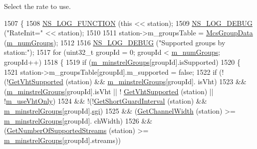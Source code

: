 Select the rate to use. 
\begin{DoxyCode}
1507 \{
1508   \hyperlink{log-macros-disabled_8h_a90b90d5bad1f39cb1b64923ea94c0761}{NS\_LOG\_FUNCTION} (\textcolor{keyword}{this} << station);
1509   \hyperlink{group__logging_ga413f1886406d49f59a6a0a89b77b4d0a}{NS\_LOG\_DEBUG} (\textcolor{stringliteral}{"RateInit="} << station);
1510 
1511   station->m\_groupsTable = \hyperlink{namespacens3_aceb821fdfc79d5a5aa23d14f85063f07}{McsGroupData} (\hyperlink{classns3_1_1MinstrelHtWifiManager_a8a0964148ee665bab466b2858e8094b7}{m\_numGroups});
1512 
1516   \hyperlink{group__logging_ga413f1886406d49f59a6a0a89b77b4d0a}{NS\_LOG\_DEBUG} (\textcolor{stringliteral}{"Supported groups by station:"});
1517   \textcolor{keywordflow}{for} (uint32\_t groupId = 0; groupId < \hyperlink{classns3_1_1MinstrelHtWifiManager_a8a0964148ee665bab466b2858e8094b7}{m\_numGroups}; groupId++)
1518     \{
1519       \textcolor{keywordflow}{if} (\hyperlink{classns3_1_1MinstrelHtWifiManager_a231741ce3f38417925019aa598570468}{m\_minstrelGroups}[groupId].isSupported)
1520         \{
1521           station->m\_groupsTable[groupId].m\_supported = \textcolor{keyword}{false};
1522           \textcolor{keywordflow}{if} (!(!\hyperlink{classns3_1_1WifiRemoteStationManager_aecf5ed3203b9b55cd831696a08daa5fe}{GetVhtSupported} (station) && \hyperlink{classns3_1_1MinstrelHtWifiManager_a231741ce3f38417925019aa598570468}{m\_minstrelGroups}[groupId].
      isVht)                    
1523               && (\hyperlink{classns3_1_1MinstrelHtWifiManager_a231741ce3f38417925019aa598570468}{m\_minstrelGroups}[groupId].isVht || !
      \hyperlink{classns3_1_1WifiRemoteStationManager_aecf5ed3203b9b55cd831696a08daa5fe}{GetVhtSupported} (station) || !\hyperlink{classns3_1_1MinstrelHtWifiManager_a6997df6e5760dd9891f2caea0a6e1937}{m\_useVhtOnly}) 
1524               && !(!\hyperlink{classns3_1_1WifiRemoteStationManager_aa55f6cb04128c88710119c8289f1b17e}{GetShortGuardInterval} (station) && 
      \hyperlink{classns3_1_1MinstrelHtWifiManager_a231741ce3f38417925019aa598570468}{m\_minstrelGroups}[groupId].\hyperlink{namespacestd}{sgi})             
1525               && (\hyperlink{classns3_1_1WifiRemoteStationManager_a918213c5b9fa629c4986f6d90521bbd4}{GetChannelWidth} (station) >= \hyperlink{classns3_1_1MinstrelHtWifiManager_a231741ce3f38417925019aa598570468}{m\_minstrelGroups}[groupId].
      chWidth)                 
1526               && (\hyperlink{classns3_1_1WifiRemoteStationManager_a5b08585f67c512242a2f3a53eeedade3}{GetNumberOfSupportedStreams} (station) >= 
      \hyperlink{classns3_1_1MinstrelHtWifiManager_a231741ce3f38417925019aa598570468}{m\_minstrelGroups}[groupId].streams))    

\end{DoxyCode}
